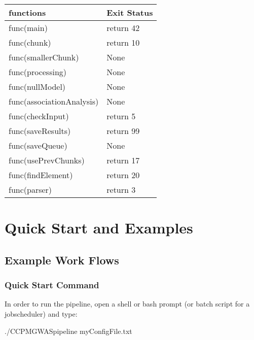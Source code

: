 \documentclass[letterpaper,10pt,english]{sphinxmanual}
\begin{document}
\begin{savenotes}\sphinxattablestart
\centering
\begin{tabulary}{\linewidth}[t]{|T|T|}
\hline
\sphinxstyletheadfamily 
functions
&\sphinxstyletheadfamily 
Exit Status
\\
\hline
func(main)
&
return 42
\\
\hline
func(chunk)
&
return 10
\\
\hline
func(smallerChunk)
&
None
\\
\hline
func(processing)
&
None
\\
\hline
func(nullModel)
&
None
\\
\hline
func(associationAnalysis)
&
None
\\
\hline
func(checkInput)
&
return 5
\\
\hline
func(saveResults)
&
return 99
\\
\hline
func(saveQueue)
&
None
\\
\hline
func(usePrevChunks)
&
return 17
\\
\hline
func(findElement)
&
return 20
\\
\hline
func(parser)
&
return 3
\\
\hline
\end{tabulary}
\par
\sphinxattableend\end{savenotes}


\chapter{Quick Start and Examples}
\label{\detokenize{index:quick-start-and-examples}}

\section{Example Work Flows}
\label{\detokenize{exampleWorkFlows:example-work-flows}}\label{\detokenize{exampleWorkFlows::doc}}

\subsection{Quick Start Command}
\label{\detokenize{exampleWorkFlows:quick-start-command}}
In order to run the pipeline, open a shell or bash prompt (or batch script for a job\sphinxhyphen{}scheduler) and type:

\begin{sphinxVerbatim}[commandchars=\\\{\}]
\PYGZdl{} ./CCPM\PYGZus{}GWAS\PYGZus{}pipeline myConfigFile.txt
\end{sphinxVerbatim}
\end{document}

